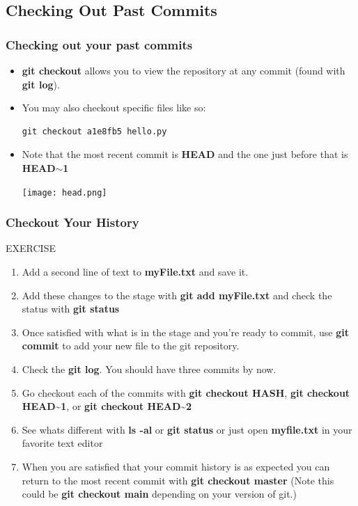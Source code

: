 \documentclass{beamer}
\begin{document}
\subsection{Checking Out Past Commits}

\begin{frame}[fragile]
\frametitle{Checking out your past commits}
\begin{itemize}
\item \textbf{git checkout} allows you to view the repository at any commit (found with \textbf{git log}).
\item You may also checkout specific files like so: 
        \begin{lstlisting}
git checkout a1e8fb5 hello.py
        \end{lstlisting}
\item Note that the most recent commit is \textbf{HEAD} and the one just before that is \textbf{HEAD$\mathbf{\sim}$1}
\begin{center}\texttt{[image: head.png]}\end{center}
\end{itemize}
\end{frame}

\begin{frame}[fragile]
\frametitle{Checkout Your History}
    \begin{block}{EXERCISE}
        \begin{enumerate}
	 \item Add a second line of text to \textbf{myFile.txt} and save it.
	 \item Add these changes to the stage with \textbf{git add myFile.txt} and check the status with \textbf{git status}
        \item Once satisfied with what is in the stage and you're ready to commit, use \textbf{git commit} to add your new file to the git repository.
        \item Check the \textbf{git log}. You should have three commits by now.
	 \item Go checkout each of the commits with \textbf{git checkout \textlangle{}HASH\textrangle{}}, \textbf{git checkout HEAD\textasciitilde1}, or \textbf{git checkout HEAD\textasciitilde2}
	 \item See whats different with \textbf{ls -al} or \textbf{git status} or just open \textbf{myfile.txt} in your favorite text editor
	 \item When you are satisfied that your commit history is as expected you can return to the most recent commit with \textbf{git checkout master} (Note this could be \textbf{git checkout main} depending on your version of git.)
        \end{enumerate}
    \end{block}
\end{frame}
\end{document}
